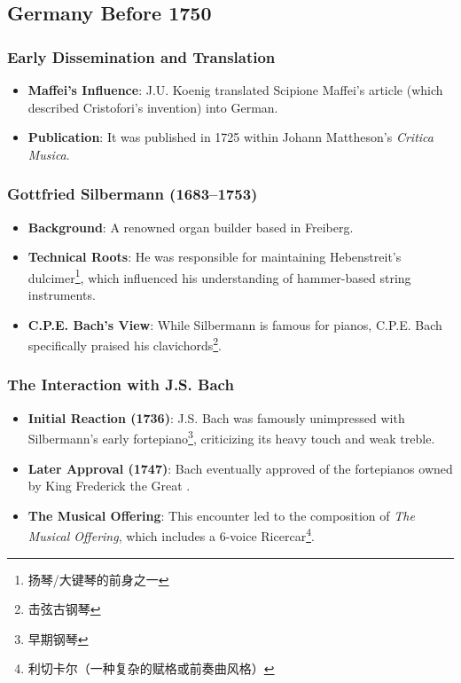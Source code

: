 \documentclass[math,code]{amznotes}
\theoremstyle{remark}
\begin{document}
\subsection{Germany Before 1750}

\subsubsection{Early Dissemination and Translation}
\begin{itemize}
    \item \textbf{Maffei's Influence}: J.U. Koenig translated Scipione Maffei's article (which described Cristofori's invention) into German. 
    \item \textbf{Publication}: It was published in 1725 within Johann Mattheson's \textit{Critica Musica}.
\end{itemize}

\subsubsection{Gottfried Silbermann (1683–1753)}
\begin{itemize}
    \item \textbf{Background}: A renowned organ builder based in Freiberg.
    \item \textbf{Technical Roots}: He was responsible for maintaining Hebenstreit's dulcimer\footnote{扬琴/大键琴的前身之一}, which influenced his understanding of hammer-based string instruments.
    \item \textbf{C.P.E. Bach's View}: While Silbermann is famous for pianos, C.P.E. Bach specifically praised his clavichords\footnote{击弦古钢琴}.
\end{itemize}

\subsubsection{The Interaction with J.S. Bach}
\begin{itemize}
    \item \textbf{Initial Reaction (1736)}: J.S. Bach was famously unimpressed with Silbermann's early fortepiano\footnote{早期钢琴}, criticizing its heavy touch and weak treble.
    \item \textbf{Later Approval (1747)}: Bach eventually approved of the fortepianos owned by King Frederick the Great
    .
    \item \textbf{The Musical Offering}: This encounter led to the composition of \textit{The Musical Offering}, which includes a 6-voice Ricercar\footnote{利切卡尔（一种复杂的赋格或前奏曲风格）}.
\end{itemize}
\end{document}
